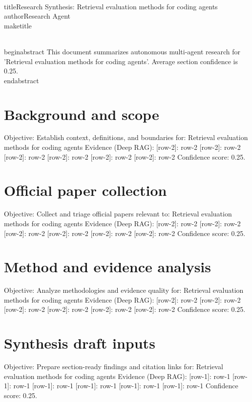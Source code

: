 \documentclass[conference]{IEEEtran}
\begin{document}
\\titleResearch Synthesis: Retrieval evaluation methods for coding agents
\\authorResearch Agent
\\maketitle

\\begin{abstract}
This document summarizes autonomous multi-agent research for 'Retrieval evaluation methods for coding agents'. Average section confidence is 0.25.
\\end{abstract}

\section{Background and scope}
Objective: Establish context, definitions, and boundaries for: Retrieval evaluation methods for coding agents
Evidence (Deep RAG):
[row-2]: row-2
[row-2]: row-2
[row-2]: row-2
[row-2]: row-2
[row-2]: row-2
[row-2]: row-2
Confidence score: 0.25. \cite{f2_fake_2,f1_fake_2,f2_fake_1}

\section{Official paper collection}
Objective: Collect and triage official papers relevant to: Retrieval evaluation methods for coding agents
Evidence (Deep RAG):
[row-2]: row-2
[row-2]: row-2
[row-2]: row-2
[row-2]: row-2
[row-2]: row-2
[row-2]: row-2
Confidence score: 0.25. \cite{t4_fake_2,f1_fake_1,t3_fake_1}

\section{Method and evidence analysis}
Objective: Analyze methodologies and evidence quality for: Retrieval evaluation methods for coding agents
Evidence (Deep RAG):
[row-2]: row-2
[row-2]: row-2
[row-2]: row-2
[row-2]: row-2
[row-2]: row-2
[row-2]: row-2
Confidence score: 0.25. \cite{t4_fake_1,t2_fake_2,f1_fake_2}

\section{Synthesis draft inputs}
Objective: Prepare section-ready findings and citation links for: Retrieval evaluation methods for coding agents
Evidence (Deep RAG):
[row-1]: row-1
[row-1]: row-1
[row-1]: row-1
[row-1]: row-1
[row-1]: row-1
[row-1]: row-1
Confidence score: 0.25. \cite{t3_fake_1,t2_fake_2,t3_fake_2}
\end{document}
